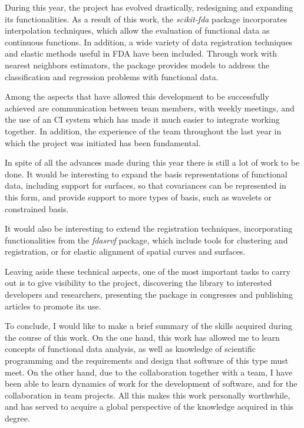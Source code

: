 
During this year, the project has evolved drastically, redesigning and expanding
its functionalities.
As a result of this work, the \textit{scikit-fda} package incorporates
interpolation techniques, which allow the evaluation of functional data as
continuous functions. In addition, a wide variety of data registration
techniques and elastic methods useful in \acs{FDA} have been included.
Through work with nearest neighbors estimators,
the package provides models to address the classification and regression problems
with functional data.

Among the aspects that have allowed this development to be successfully achieved
are communication between team members, with weekly meetings, and the use of
an CI system which has made it much easier to integrate working together.
In addition, the experience of the team throughout the last year in which the
project was initiated has been fundamental.

In spite of all the advances made during this year there is still a lot of work
to be done.
It would be interesting to expand the basis
representations of functional data, including support for surfaces, so that
covariances can be represented in this form, and provide support to more types of basis,
such as wavelets \cite{Morettin2017} or constrained basis\cite{Ramsay2005}.

It would also be interesting to extend the registration techniques,
incorporating functionalities from the \textit{fdasrvf}\cite{fdasrvf} package,
which include tools for clustering and registration, or for elastic
alignment of spatial curves and surfaces.

Leaving aside these technical aspects, one of the most important tasks to carry
out is to give visibility to the project, discovering the library to interested
developers and researchers, presenting the package in congresses and publishing
articles to promote its use.

To conclude, I would like to make a brief summary of the skills acquired during
the course of this work. On the one hand, this work has allowed me to learn concepts
of functional data analysis, as well as knowledge of scientific programming
and the requirements and design that software of this type must meet.
On the other hand, due to the collaboration together with a team,
I have been able to learn dynamics of work for the development of software,
and for the collaboration in team projects.
All this  makes this work personally worthwhile,  and has served to acquire a
global perspective of the knowledge acquired in this degree.
